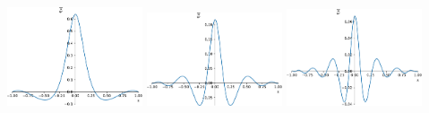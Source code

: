 \begin{center}
  \includegraphics[width = 0.3\textwidth]{chapter_09/exercise_09_48_figure_4.pdf}
  \hspace{1em}
  \includegraphics[width = 0.3\textwidth]{chapter_09/exercise_09_48_figure_5.pdf}
  \hspace{1em}
  \includegraphics[width = 0.3\textwidth]{chapter_09/exercise_09_48_figure_6.pdf}
\end{center}
